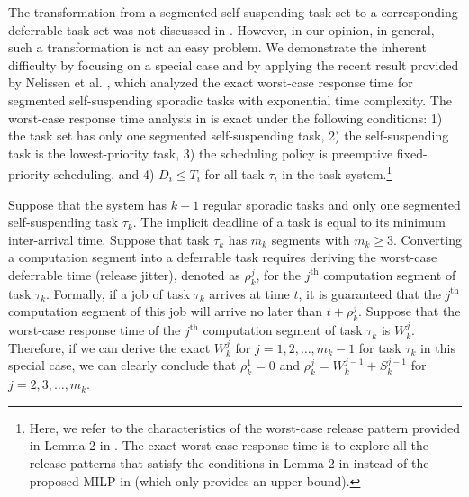 The transformation from a segmented self-suspending task set to a corresponding deferrable task set was not discussed in \cite{Raj:suspension1991}. However, in our opinion, in general, such a transformation is not an easy problem. We demonstrate the inherent difficulty by focusing on a special case and by applying the recent result provided by Nelissen et al. \cite{ecrts15nelissen}, which analyzed the exact worst-case response time for segmented self-suspending sporadic tasks with exponential time complexity. The worst-case response time analysis in \cite{ecrts15nelissen} is exact under the following conditions: 1) the task set has only one segmented self-suspending task, 2) the self-suspending task is the lowest-priority task, 3) the scheduling policy is preemptive fixed-priority scheduling, and 4) $D_i \leq T_i$ for all task $\tau_i$ in the task system.\footnote{Here, we refer to the characteristics of the worst-case release pattern provided in Lemma 2 in \cite{ecrts15nelissen}. The exact worst-case response time is to explore all the release patterns that satisfy the conditions in Lemma 2 in \cite{ecrts15nelissen} instead of the proposed MILP in \cite{ecrts15nelissen} (which only provides an upper bound). }

Suppose that the system has $k-1$ regular sporadic tasks and only one segmented self-suspending task $\tau_k$. The implicit deadline of a task is equal to its minimum inter-arrival time. Suppose that task $\tau_k$ has $m_k$ segments with $m_k \geq 3$.  Converting a computation segment into a deferrable task requires deriving the worst-case deferrable time (release jitter), denoted as $\rho_k^j$, for the $j^{\mathrm{th}}$ computation segment of task $\tau_k$. Formally, if a job of task $\tau_k$ arrives at time $t$, it is guaranteed that the $j^{\mathrm{th}}$ computation segment of this job will arrive no later than $t+\rho_k^j$. Suppose that the worst-case response time of the $j^{\mathrm{th}}$ computation segment of task $\tau_k$ is $W_k^j$. Therefore,  if we can derive the exact $W_k^j$ for $j=1,2,\ldots,m_k-1$ for task $\tau_k$ in this special case, we can clearly conclude that $\rho_k^1=0$ and $\rho_k^j = W_k^{j-1}+S_k^{j-1}$ for $j=2,3,\ldots,m_k$.


